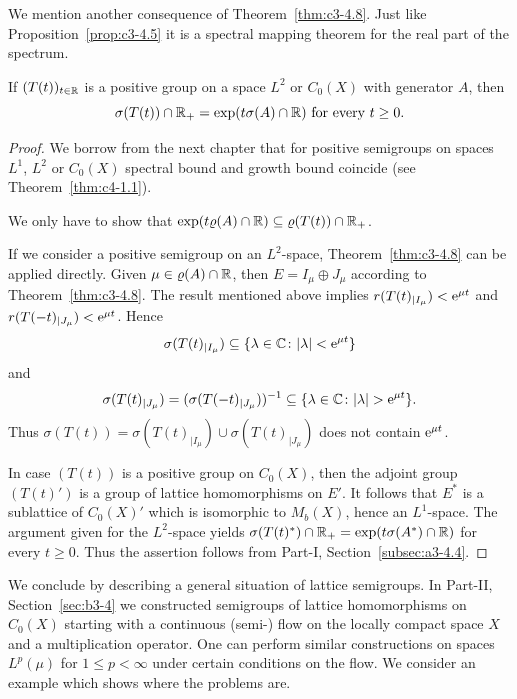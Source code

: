 We mention another consequence of Theorem~\ref{thm:c3-4.8}. Just like Proposition~\ref{prop:c3-4.5} it is a
spectral mapping theorem for the real part of the spectrum.
\begin{corollary}\label{cor:c3-4.10}
If\/ $(T(t))_{t \in \mathbb{R} }$ is a positive group on a space $L^2$ or
$C_0(X)$ with generator $A$, then
\begin{equation}\label{eq:c3-4.11}
	\sigma(T(t)) \cap \R _+ = \exp(t\sigma(A) \cap \R ) \  \text{for every} \  t \geq 0 .
\end{equation}
\end{corollary}
\begin{proof} 
We borrow from the next chapter that for positive semigroups on
spaces $L^1$, $L^2$ or $C_0(X)$ spectral bound%
and growth bound%
coincide (see Theorem~\ref{thm:c4-1.1}).

We only have to show that $\exp(t\rho(A) \cap \R ) \subseteq \rho(T(t)) \cap \R _+$.

If we consider a positive semigroup on an $L^2$-space, Theorem~\ref{thm:c3-4.8} can be
applied directly. Given $\mu \in \rho(A) \cap \R $, then $E = I_{\mu} \oplus J_{\mu}$ according to
Theorem~\ref{thm:c3-4.8}. 
The result mentioned above implies 
$r(T(t)_{|I_{\mu}}) < \mathrm{e}^{\mu t}$ and
$r(T(-t)_{|J_{\mu}}) < \mathrm{e}^{\mu t}$. 
Hence 
%
\[
	\sigma(T(t)_{|I_{\mu}}) \subseteq \{\lambda \in \mathbb{C}  \colon |\lambda| < \mathrm{e}^{\mu t}\}
\]
and
\[
	\sigma(T(t)_{|J_{\mu}}) = (\sigma(T(-t)_{|J_{\mu}}))^{-1} 
		\subseteq \{\lambda \in \mathbb{C}  \colon |\lambda| > \mathrm{e}^{\mu t}\}.
\]
%
Thus $\sigma(T(t)) = \sigma(T(t)_{|I_{\mu}}) \cup \sigma(T(t)_{|J_{\mu}})$ does not contain $\mathrm{e}^{\mu t}$.

In case $(T(t))$ is a positive group on $C_0(X)$, then the adjoint
group $(T(t)')$ is a group of lattice homomorphisms on $E'$. It
follows that $E^*$ is a sublattice of\/ $C_0(X)'$ which is isomorphic to $M_b(X)$, hence an
$L^1$-space. 
The argument given for the $L^2$-space yields
$\sigma(T(t)^*) \cap \mathbb{R} _+ = \exp(t\sigma(A^*) \cap \mathbb{R} )$ for every $t \geq 0$. 
Thus the assertion follows from Part-I, Section~\ref{subsec:a3-4.4}.
\end{proof}
We conclude by describing a general situation of lattice semigroups. 
In Part-II, Section~\ref{sec:b3-4} we constructed semigroups of lattice
homomorphisms on $C_0(X)$ starting with a continuous (semi-) flow on the
locally compact space $X$ and a multiplication operator. 
One can perform similar constructions on spaces $L^p(\mu)$ for $1 \leq p < \infty$ under
certain conditions on the flow. 
We consider an example which shows where the problems are.

